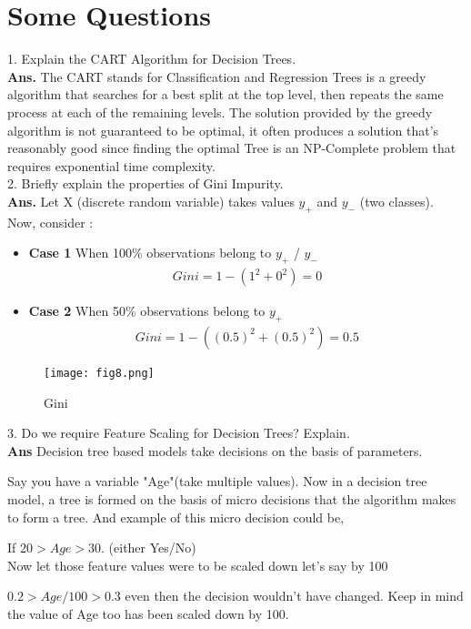 \documentclass[a4paper, 11pt]{article}
\begin{document}
\section{Some Questions}
1. Explain the CART Algorithm for Decision Trees.\\
\textbf{Ans.}  The CART stands for Classification and Regression Trees is a greedy algorithm that searches for a best split at the top level, then repeats the same process at each of the remaining levels.
The solution provided by the greedy algorithm is not guaranteed to be optimal, it often produces a solution that’s reasonably good since finding the optimal Tree is an NP-Complete problem that requires exponential time complexity.\\
2. Briefly explain the properties of Gini Impurity. \\
\textbf{Ans.} Let X (discrete random variable) takes values $y_+$ and $y_-$ (two classes). Now, consider :
\begin{itemize}
\item \textbf{Case 1} When 100\% observations belong to $y_+$ / $y_-$
\begin{align}
    Gini  = 1 - (1^2+0^2) = 0
\end{align}
\item \textbf{Case 2} When 50\% observations belong to $y_+$ 
\begin{align}
    Gini  = 1 - ((0.5)^2+(0.5)^2) = 0.5
\end{align}
\end{itemize}
\begin{figure}[h!]
    \texttt{[image: fig8.png]}
    \caption{Gini}
    \label{fig:fig8}
  \end{figure}
3.  Do we require Feature Scaling for Decision Trees? Explain. \\ 
\textbf{Ans} Decision tree based models take decisions on the basis of parameters.

Say you have a variable "Age"(take multiple values). Now in a decision tree model, a tree is formed on the basis of micro decisions that the algorithm makes to form a tree. And example of this micro decision could be,

If $20 > Age > 30$. (either Yes/No) \\
Now let those feature values were to be scaled down let's say by 100

$0.2 > Age/100 > 0.3$ even then the decision wouldn't have changed. Keep in mind the value of Age too has been scaled down by 100.
\end{document}
